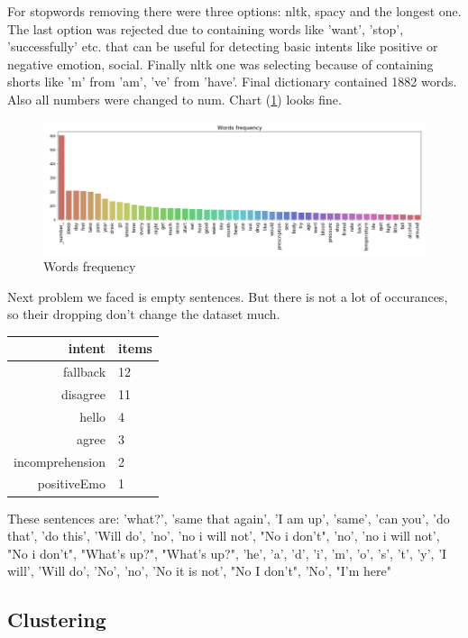 \documentclass[11pt]{article}
\begin{document}
For stopwords removing there were three options: nltk, spacy and the longest one. The last option was rejected due to containing words like 'want', 'stop', 'successfully' etc. that can be useful for detecting basic intents like positive or negative emotion, social. Finally nltk one was selecting because of containing shorts like 'm' from 'am', 've' from 'have'. Final dictionary contained 1882 words. Also all numbers were changed to num. Chart (\ref{words_freq}) looks fine.

 \begin{figure}[h]
 	\centering
 	\includegraphics[scale=0.4]{report2.png}
	\caption{Words frequency}
 \label{words_freq}
 \end{figure}
\FloatBarrier

Next problem we faced is empty sentences. But there is not a lot of occurances, so their dropping don't change the dataset much.

\begin{tabular}{ |r|l| }
\hline
intent & items \\ \hline
fallback          & 12 \\ \hline
disagree          & 11 \\ \hline
hello             &  4 \\ \hline
agree             &  3 \\ \hline
incomprehension   &  2 \\ \hline
positiveEmo       &  1 \\ \hline
\end{tabular}

These sentences are: 'what?', 'same that again', 'I am up', 'same', 'can you',
       'do that', 'do this', 'Will do', 'no', 'no i will not',
       "No i don't", 'no', 'no i will not', "No i don't", "What's up?",
       "What's up?", 'he', 'a', 'd', 'i', 'm', 'o', 's', 't', 'y',
       'I will', 'Will do', 'No', 'no', 'No it is not', "No I don't",
       'No', "I'm here"


\subsection{Clustering}
\end{document}
